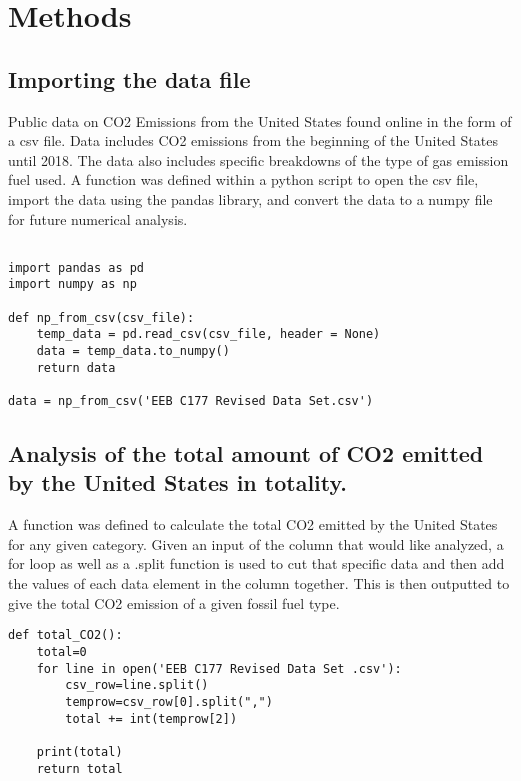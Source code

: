 \documentclass[letterpaper]{article}
\begin{document}
\section{Methods}

\subsection{Importing the data file}

Public data on CO2 Emissions from the United States found online in the form of a csv file. Data includes CO2 emissions from the beginning of the United States until 2018. The data also includes specific breakdowns of the type of gas emission fuel used.  A function was defined within a python script to open the csv file, import the data using the pandas library, and convert the data to a numpy file for future numerical analysis.
\vspace{0.25cm}

\lstset{language=Python}
\begin{lstlisting}[frame=single]  

import pandas as pd
import numpy as np

def np_from_csv(csv_file):
    temp_data = pd.read_csv(csv_file, header = None)
    data = temp_data.to_numpy()
    return data

data = np_from_csv('EEB C177 Revised Data Set.csv')

\end{lstlisting}

\subsection{Analysis of the total amount of CO2 emitted by the United States in totality. }

A function was defined to calculate the total CO2 emitted by the United States for any given category. Given an input of the column that would like analyzed, a for loop as well as a .split function is used to cut that specific data and then add the values of each data element in the column together. This is then outputted to give the total CO2 emission of a given fossil fuel type. 

\vspace{0.25cm}

\lstset{language=Python}
\begin{lstlisting}[frame=single] 
def total_CO2():
    total=0
    for line in open('EEB C177 Revised Data Set .csv'):
        csv_row=line.split()
        temprow=csv_row[0].split(",")
        total += int(temprow[2])

    print(total)
    return total
\end{lstlisting}
\end{document}

